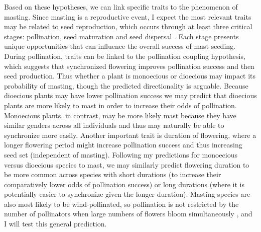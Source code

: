 \documentclass[11pt,letter]{article}
\begin{document}
Based on these hypotheses, we can link specific traits to the phenomenon of masting. Since masting is a reproductive event, I expect the most relevant traits may be related to seed reproduction, which occurs through at least three critical stages: pollination, seed maturation and seed dispersal \citep{satake2021studying}. Each stage presents unique opportunities that can influence the overall success of mast seeding. During pollination, traits can be linked to the pollination coupling hypothesis, which suggests that synchronized flowering improves pollination success and then seed production. Thus whether a plant is monoecious or dioecious may impact its probability of masting, though the predicted directionality is arguable. Because dioecious plants may have lower pollination success \citep[where separate genders for each individual plant may reduce pollination success in low-density populations,][]{bawa1980evolution} we may predict that dioecious plants are more likely to mast in order to increase their odds of pollination. Monoecious plants, in contrast, may be more likely mast because they have similar genders across all individuals and thus may naturally be able to synchronize more easily.  Another important trait is duration of flowering, where a longer flowering period might increase pollination success \citep{knight2005pollen} and thus increasing seed set (independent of masting). Following my predictions for monoecious versus dioecious species to mast, we may similarly predict flowering duration to be more common across species with short durations (to increase their comparatively lower odds of pollination success) or long durations (where it is potentially easier to synchronize given the longer duration). Masting species are also most likely to be wind-pollinated, so pollination is not restricted by the number of pollinators when large numbers of flowers bloom simultaneously \citep{bogdziewicz2017masting,bogdziewicz2020flowering}, and I will test this general prediction.
\end{document}
